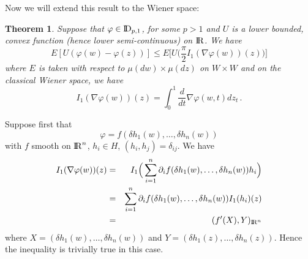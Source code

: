 \documentclass[12pt,a4paper]{book}
\newtheorem{theorem}{Theorem}[section]
\newcommand{\DD}{{\rm I\!D}}
\newcommand{\R}{{\rm I\!R}}
\newcommand{\proof}{\noindent {\bf Proof:\ }}
\begin{document}
Now we will extend this result to the Wiener space:
\begin{theorem}
Suppose that $\varphi\in \DD_{p,1}$, for some $p>1$ and $U$ is a lower bounded,
 convex function (hence lower semi-continuous) on $\R$. We have
$$
E[U(\varphi(w)-\varphi(z))]\leq E\Big[ U\Big(
\frac{\pi}{2}I_1(\nabla\varphi(w))(z)\Big)\Big]
$$
where $E$ is taken with respect to $\mu(dw)\times\mu(dz)$ on $W\times W$ and
on the classical Wiener space, we have
$$
I_1(\nabla\varphi(w))(z)=\int_0^1\frac{d}{dt}
\nabla\varphi(w,t)dz_t\,.
$$
\end{theorem}
\label{th2}
\proof
Suppose first that
$$
\varphi=f(\delta h_1(w),\ldots,\delta h_n(w))
$$
with $f$ smooth on $\R^n$, $h_i\in H$, $(h_i,h_j)=\delta_{ij}$. We have
\begin{eqnarray*}
I_1(\nabla\varphi(w))(z) & = & I_1 \Big( \sum_{i=1}^n \partial_if(\delta
h_1(w),\ldots,\delta h_n(w))h_i\Big) \\
& = & \sum_{i=1}^{n}\partial_if(\delta h_1(w),
       \ldots,\delta h_n(w))I_1(h_i)(z) \\
& = & (f'(X),Y)_{\R^n}
\end{eqnarray*}
where $X=(\delta h_1(w),\ldots,\delta h_n(w))$ and $Y=(\delta
h_1(z),\ldots,\delta h_n(z))$. Hence the inequality is trivially true in this
case.
\end{document}
